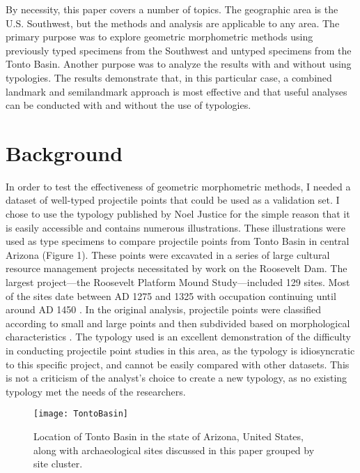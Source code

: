\documentclass[PCJ,Unicode,screen,mode=plain]{cedram}
\begin{document}
By necessity, this paper covers a number of topics. The geographic area is the U.S. Southwest, but the methods and analysis are applicable to any area. The primary purpose was to explore geometric morphometric methods using previously typed specimens from the Southwest and untyped specimens from the Tonto Basin. Another purpose was to analyze the results with and without using typologies. The results demonstrate that, in this particular case, a combined landmark and semilandmark approach is most effective and that useful analyses can be conducted with and without the use of typologies.

\section{Background}

In order to test the effectiveness of geometric morphometric methods, I needed a dataset of well-typed projectile points that could be used as a validation set. I chose to use the typology published by Noel Justice \autocite*{Justice2002-cf} for the simple reason that it is easily accessible and contains numerous illustrations. These illustrations were used as type specimens to compare projectile points from Tonto Basin in central Arizona (Figure 1). These points were excavated in a series of large cultural resource management projects necessitated by work on the Roosevelt Dam. The largest project---the Roosevelt Platform Mound Study---included 129 sites. Most of the sites date between AD 1275 and 1325 with occupation continuing until around AD 1450 \autocite{Rice1998-ku}. In the original analysis, projectile points were classified according to small and large points and then subdivided based on morphological characteristics \autocite[p.727]{Rice1994-rk}. The typology used is an excellent demonstration of the difficulty in conducting projectile point studies in this area, as the typology is idiosyncratic to this specific project, and cannot be easily compared with other datasets. This is not a criticism of the analyst's choice to create a new typology, as no existing typology met the needs of the researchers.

\begin{figure}
\texttt{[image: TontoBasin]} \caption{Location of Tonto Basin in the state of Arizona, United States, along with archaeological sites discussed in this paper grouped by site cluster.}\label{fig:TontoBasinMap}
\end{figure}
\end{document}
